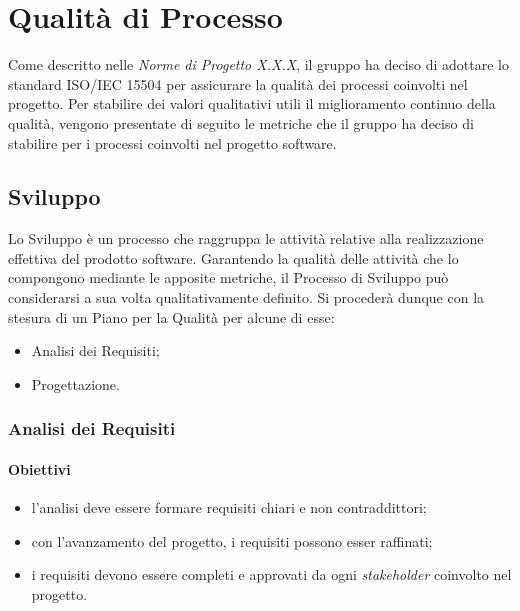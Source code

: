 \section{Qualità di Processo}
Come descritto nelle \textit{Norme di Progetto X.X.X}, il gruppo ha deciso di adottare lo standard ISO/IEC 15504 per assicurare la qualità dei processi coinvolti nel progetto. Per stabilire dei valori qualitativi utili il miglioramento continuo della qualità, vengono presentate di seguito le metriche che il gruppo ha deciso di stabilire per i processi coinvolti nel progetto software.
\subsection{Sviluppo}
Lo Sviluppo è un processo che raggruppa le attività relative alla realizzazione effettiva del prodotto software. Garantendo la qualità delle attività che lo compongono mediante le apposite metriche, il Processo di Sviluppo può considerarsi a sua volta qualitativamente definito. Si procederà dunque con la stesura di un Piano per la Qualità per alcune di esse:
\begin{itemize}
	\item Analisi dei Requisiti;
	\item Progettazione.
\end{itemize}
\subsubsection{Analisi dei Requisiti}
\paragraph{Obiettivi}
\begin{itemize}
	\item l'analisi deve essere formare requisiti chiari e non contraddittori;
	\item con l'avanzamento del progetto, i requisiti possono esser raffinati;
	\item i requisiti devono essere completi e approvati da ogni \textit{stakeholder\glo} coinvolto nel progetto.
\end{itemize}
